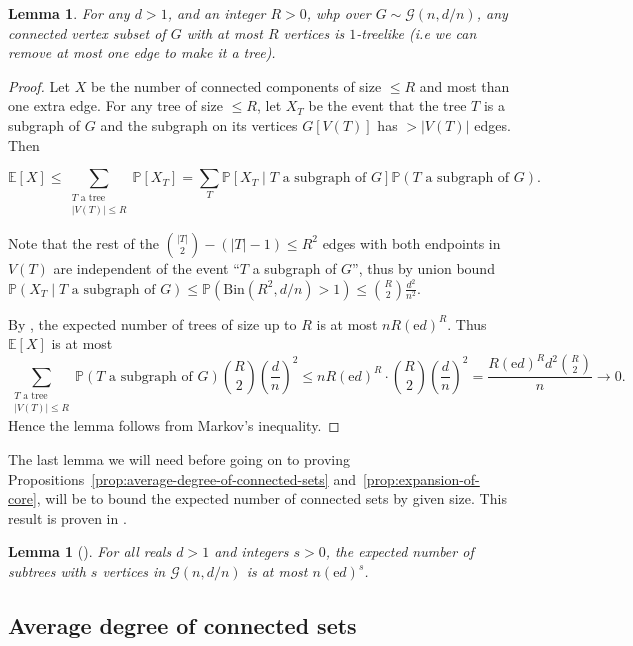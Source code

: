 \documentclass[11pt]{article}
\theoremstyle{plain}
\newtheorem{lemma}[theorem]{Lemma}
\newcommand{\G}{\mathcal{G}}
\newcommand{\emm}{\mathrm{e}}
\newcommand{\E}{\mathds{E}}
\renewcommand{\P}{\mathds{P}}
\newcommand{\1}{\mathbb{1}}
\newcommand{\Bin}{\text{Bin}}
\begin{document}
\begin{lemma}\label{lem:1-treelikeness-for-constant-size}
    For any \(d > 1\), and an integer \(R > 0\), whp over \(G\sim\G(n,d/n)\), any connected vertex subset of \(G\) with at most \(R\) vertices is \(1\)-treelike (i.e we can remove at most one edge to make it a tree).
\end{lemma}
\begin{proof}
    Let \(X\) be the number of connected components of size \(\leq R\) and most than one extra edge. For any tree of size \(\leq R\), let \(X_T\) be the event that the tree \(T\) is a subgraph of \(G\) and the subgraph on its vertices \(G[V(T)]\) has \(> |V(T)|\) edges. Then

    \[
    \E[X] \leq \sum_{\substack{T\text{ a tree}\\|V(T)|\leq R}} \P[X_T] = \sum_T \P[X_T \mid T\text{ a subgraph of }G] \P(T\text{ a subgraph of }G).
    \]

    Note that the rest of the \(\binom{|T|}{2}-(|T|-1)\leq R^2\) edges with both endpoints in \(V(T)\) are independent of the event ``\(T\) a subgraph of \(G\)'', thus by union bound \(\P(X_T \mid T\text{ a subgraph of }G)\leq \P(\Bin(R^2, d/n) > 1) \leq \binom{R}{2} \frac{d^2}{n^2} \).
    
    By \cite{fountoulakis2007evolution}, the expected number of trees of size up to \(R\) is at most \(nR(\emm d)^R\). Thus \(\E[X]\) is at most
    \[
    \sum_{\substack{T\text{ a tree}\\|V(T)|\leq R}} \P(T\text{ a subgraph of }G) \binom{R}{2}\left(\frac{d}{n}\right)^2 \leq n R(\emm d)^R \cdot \binom{R}{2}\left(\frac{d}{n}\right)^2 = \frac{R(\emm d)^R d^2 \binom{R}{2}}{n} \rightarrow 0.
    \]
    Hence the lemma follows from Markov's inequality.
\end{proof}

The last lemma we will need before going on to proving Propositions~\ref{prop:average-degree-of-connected-sets} and~\ref{prop:expansion-of-core}, will be to bound the expected number of connected sets by given size. This result is proven in \cite{fountoulakis2007evolution}.

\begin{lemma}[{\cite[(3)]{fountoulakis2007evolution}}]\label{lem:expected-number-of-subtrees}
    For all reals \(d > 1\) and integers \(s > 0\), the expected number of subtrees with \(s\) vertices in \(\G(n,d/n)\) is at most \(n(\emm d)^s\).
\end{lemma}


\subsection{Average degree of connected sets}\label{sec:avg-deg}
\end{document}
